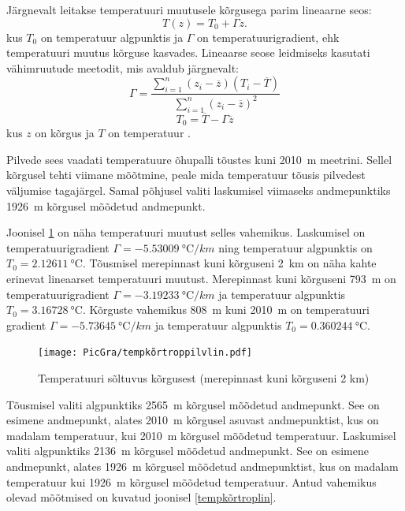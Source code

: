 \documentclass{trkut}%
\begin{document}
Järgnevalt leitakse temperatuuri muutusele kõrgusega parim lineaarne seos:
\begin{equation}
T(z) = T_0 + \Gamma z.
\end{equation}
kus $T_0$ on temperatuur algpunktis ja $\Gamma$ on temperatuurigradient, ehk temperatuuri muutus kõrguse kasvades. Lineaarse seose leidmiseks kasutati vähimruutude meetodit, mis avaldub järgnevalt:
\begin{equation}
\Gamma = \frac{\sum_{i=1}^{n}(z_i - \overline{z})(T_i - \overline{T})}{\sum_{i=1}^{n}(z_i - \overline{z})^2}
\end{equation}
\begin{equation}
T_0 = \overline{T} - \Gamma \overline{z}
\end{equation}
kus $z$ on kõrgus ja $T$ on temperatuur \parencite[252-285]{mat}.

Pilvede sees vaadati temperatuure õhupalli tõustes kuni \SI{2010}{m} meetrini. Sellel kõrgusel tehti viimane mõõtmine, peale mida temperatuur tõusis pilvedest väljumise tagajärgel. Samal põhjusel valiti laskumisel viimaseks andmepunktiks \SI{1926}{m} kõrgusel mõõdetud andmepunkt.

Joonisel \ref{tempkõrtroppilvlin} on näha temperatuuri muutust selles vahemikus. Laskumisel on temperatuurigradient $\Gamma =  \SI{-5.53009}{\degreeCelsius/km}$ ning temperatuur algpunktis on $T_0 = \SI{2.12611}{\degreeCelsius}$. Tõusmisel merepinnast kuni kõrguseni \SI{2}{km} on näha kahte erinevat lineaarset temperatuuri muutust. Merepinnast kuni kõrguseni \SI{793}{m} on temperatuurigradient $\Gamma =\SI{-3.19233}{\degreeCelsius/km}$ ja temperatuur algpunktis $T_0 = \SI{3.16728}{\degreeCelsius}$. Kõrguste vahemikus \SI{808}{m} kuni \SI{2010}{m} on temperatuuri gradient $\Gamma =\SI{-5.73645}{\degreeCelsius/km}$ ja temperatuur algpunktis $T_0 = \SI{0.360244}{\degreeCelsius}$.

\begin{figure}[h]
	\texttt{[image: PicGra/tempkõrtroppilvlin.pdf]}
	\caption{Temperatuuri sõltuvus kõrgusest (merepinnast kuni kõrguseni 2 km)}
	\label{tempkõrtroppilvlin}%
\end{figure}


Tõusmisel valiti algpunktiks \SI{2565}{m} kõrgusel mõõdetud andmepunkt. See on esimene andmepunkt, alates \SI{2010}{m} kõrgusel asuvast andmepunktist, kus on madalam temperatuur, kui \SI{2010}{m} kõrgusel mõõdetud temperatuur. Laskumisel valiti algpunktiks \SI{2136}{m} kõrgusel mõõdetud andmepunkt. See on esimene andmepunkt, alates \SI{1926}{m} kõrgusel mõõdetud andmepunktist, kus on madalam temperatuur kui \SI{1926}{m} kõrgusel mõõdetud temperatuur. Antud vahemikus olevad mõõtmised on kuvatud joonisel \ref{tempkõrtroplin}.
\end{document}

